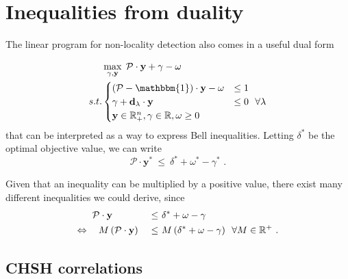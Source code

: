 \section{Inequalities from duality}
\label{seq:ineq-dual}

The linear program for non-locality detection also comes in a useful dual form

\begin{equation} \label{eq:dual}
    \begin{aligned}
          & \max_{\gamma,\mathbf{y}} \; \mathcal{P}\cdot \mathbf{y} + \gamma - \omega\\
     s.t. &
        \begin{cases}
            (\mathcal{P} - \mathbbm{1}) \cdot \mathbf{y} - \omega & \leq 1 \\
            \gamma + \mathbf{d_\lambda} \cdot \mathbf{y} & \leq 0 \ \ \forall \lambda \\
            \mathbf{y} \in \mathbb{R}_+^n, \gamma \in \mathbb{R}, \omega \geq 0
        \end{cases}
    \end{aligned}
\end{equation}
that can be interpreted as a way to express Bell inequalities. Letting $\delta^*$ be the optimal objective
value, we can write 
\begin{equation}
\mathcal{P}\cdot \mathbf{y^*} \ \leq \  \delta^* + \omega^* - \gamma^*\text{ .}
\label{eq:ineq_dual_1}
\end{equation}

Given that an inequality can be multiplied by a positive value, there exist many different
inequalities we could derive, since
\begin{equation*}
    \begin{aligned}
        &\mathcal{P}\cdot \mathbf{y} &\ \leq \ &  \delta^* + \omega - \gamma \\
        \Leftrightarrow \hspace{0.2cm} & \ \ M  \,( \mathcal{P}\cdot \mathbf{y} )&\ \leq \ &M\, (\delta^* + \omega - \gamma ) \ \ \forall M \in \mathbb{R}^+ \text{ .}
    \end{aligned}
\end{equation*}


\subsection{CHSH correlations}

